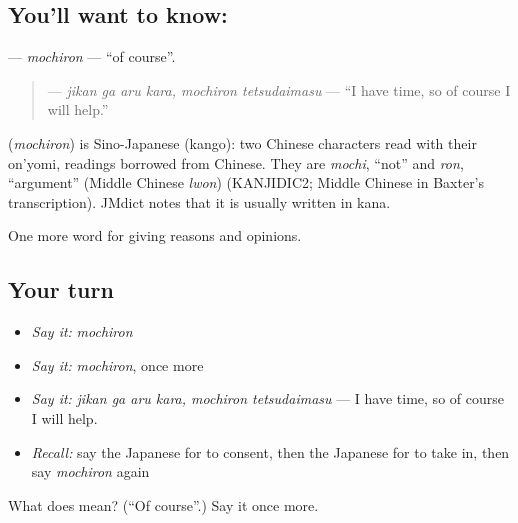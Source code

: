 \subsection*{You'll want to know: }
\textbf{} — \emph{mochiron} — \textquotedblleft{}of course\textquotedblright{}.

\begin{quote}
\textbf{  } — \emph{jikan ga aru kara, mochiron tetsudaimasu} — \textquotedblleft{}I have time, so of course I will help.\textquotedblright{}
\end{quote}

\begin{cousinweb}
\textbf{} (\emph{mochiron}) is Sino-Japanese (kango): two Chinese characters read with their on'yomi, readings borrowed from Chinese. They are \emph{mochi}, \textquotedblleft{}not\textquotedblright{} and \emph{ron}, \textquotedblleft{}argument\textquotedblright{} (Middle Chinese \emph{lwon}) (KANJIDIC2; Middle Chinese in Baxter's transcription). JMdict notes that it is usually written in kana.
\end{cousinweb}

\begin{grammarlens}[title={What you've built}]
One more word for giving reasons and opinions.
\end{grammarlens}

\subsection*{Your turn}
\begin{itemize}
\raggedright
  \item \emph{Say it:} \emph{mochiron}
  \item \emph{Say it:} \emph{mochiron}, once more
  \item \emph{Say it:} \emph{jikan ga aru kara, mochiron tetsudaimasu} — I have time, so of course I will help.
  \item \emph{Recall:} say the Japanese for to consent, then the Japanese for to take in, then say \emph{mochiron} again
\end{itemize}

\begin{tcolorbox}[breakable,colback=teal!4,colframe=teal!35!black,title={Before you move on}]
What does  mean? (\textquotedblleft{}Of course\textquotedblright{}.) Say it once more.
\end{tcolorbox}
